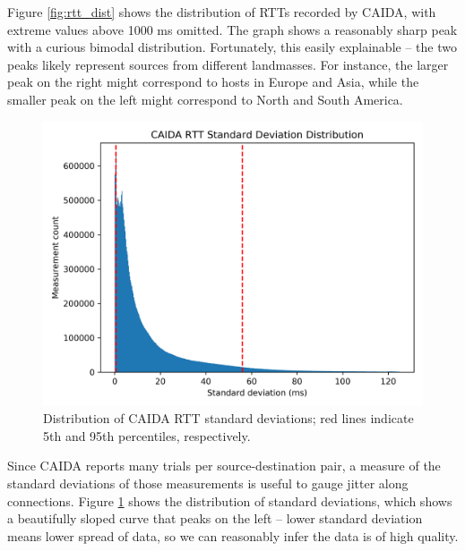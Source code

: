 \documentclass[12pt]{article}
\begin{document}
Figure \ref{fig:rtt_dist} shows the distribution of RTTs recorded by CAIDA, with extreme values above 1000 ms omitted. The graph shows a reasonably sharp peak with a curious bimodal distribution. Fortunately, this easily explainable -- the two peaks likely represent sources from different landmasses. For instance, the larger peak on the right might correspond to hosts in Europe and Asia, while the smaller peak on the left might correspond to North and South America.

\begin{figure}[H]
    \centering
    \includegraphics[width=\textwidth]{images/CAIDA_rtt_stdev_dist.png}
    \caption{Distribution of CAIDA RTT standard deviations; red lines indicate 5th and 95th percentiles, respectively.}
    \label{fig:rtt_stdev_dist}
\end{figure}

Since CAIDA reports many trials per source-destination pair, a measure of the standard deviations of those measurements is useful to gauge jitter along connections. Figure \ref{fig:rtt_stdev_dist} shows the distribution of standard deviations, which shows a beautifully sloped curve that peaks on the left -- lower standard deviation means lower spread of data, so we can reasonably infer the data is of high quality.
\end{document}
